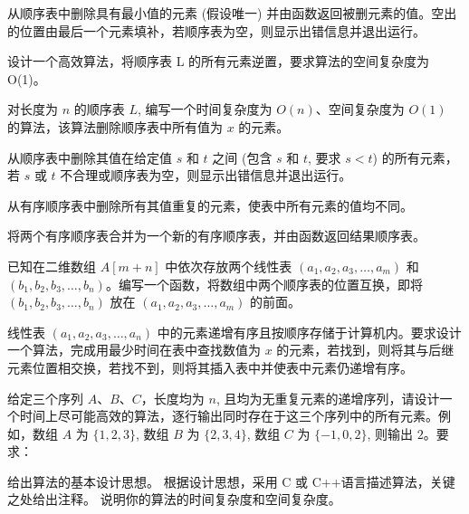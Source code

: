 \begin{qitems}

    \begin{bbox}
        \qitem 从顺序表中删除具有最小值的元素 (假设唯一) 并由函数返回被删元素的值。空出的位置由最后一个元素填补，若顺序表为空，则显示出错信息并退出运行。
    \end{bbox}

    \begin{bbox}
        \qitem 设计一个高效算法，将顺序表 L 的所有元素逆置，要求算法的空间复杂度为 O(1)。
    \end{bbox}

    \begin{bbox}
        \qitem 对长度为 $n$ 的顺序表 $L$, 编写一个时间复杂度为 $O(n)$、空间复杂度为 $O(1)$ 的算法，该算法删除顺序表中所有值为 $x$ 的元素。
    \end{bbox}

    \begin{bbox}
        \qitem 从顺序表中删除其值在给定值 $s$ 和 $t$ 之间 (包含 $s$ 和 $t$, 要求 $s<t$) 的所有元素，若 $s$ 或 $t$ 不合理或顺序表为空，则显示出错信息并退出运行。
    \end{bbox}

    \begin{bbox}
        \qitem 从有序顺序表中删除所有其值重复的元素，使表中所有元素的值均不同。
    \end{bbox}

    \begin{bbox}
        \qitem 将两个有序顺序表合并为一个新的有序顺序表，并由函数返回结果顺序表。
    \end{bbox}

    \begin{bbox}
        \qitem 已知在二维数组 $A[m+n]$ 中依次存放两个线性表 $(a_1,a_2,a_3,\dots,a_m)$ 和 $(b_1,b_2,b_3,\dots,b_n)$。编写一个函数，将数组中两个顺序表的位置互换，即将 $(b_1,b_2,b_3,\dots,b_n)$ 放在 $(a_1,a_2,a_3,\dots,a_m)$ 的前面。
    \end{bbox}

    \begin{bbox}
        \qitem 线性表 $(a_1,a_2,a_3,\dots,a_n)$ 中的元素递增有序且按顺序存储于计算机内。要求设计一个算法，完成用最少时间在表中查找数值为 $x$ 的元素，若找到，则将其与后继元素位置相交换，若找不到，则将其插入表中并使表中元素仍递增有序。
    \end{bbox}

    \begin{bbox}
        \qitem 给定三个序列 $A、B、C$，长度均为 $n$, 且均为无重复元素的递增序列，请设计一个时间上尽可能高效的算法，逐行输出同时存在于这三个序列中的所有元素。例如，数组 $A$ 为 $\{1,2,3\}$, 数组 $B$ 为 $\{2,3,4\}$, 数组 $C$ 为 $\{-1,0,2\}$, 则输出 $2$。要求：
        \begin{subqitems}
            \subqitem 给出算法的基本设计思想。
            \subqitem 根据设计思想，采用 C 或 C++语言描述算法，关键之处给出注释。
            \subqitem 说明你的算法的时间复杂度和空间复杂度。
        \end{subqitems}
    \end{bbox}


\end{qitems}
